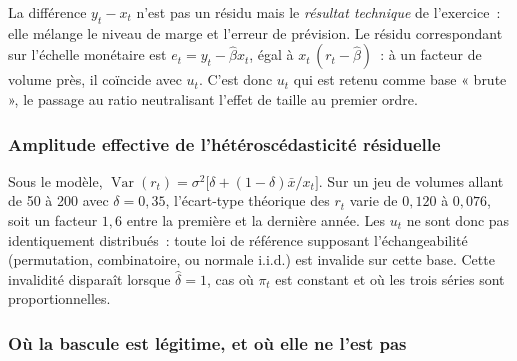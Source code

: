 \documentclass[a4paper,11pt]{article}
\begin{document}
\noindent
La différence $y_t - x_t$ n'est pas un résidu mais le \emph{résultat technique}
de l'exercice~: elle mélange le niveau de marge et l'erreur de prévision. Le
résidu correspondant sur l'échelle monétaire est $e_t = y_t - \hat\beta x_t$,
égal à $x_t\,(r_t - \hat\beta)$~: à un facteur de volume près, il coïncide avec
$u_t$. C'est donc $u_t$ qui est retenu comme base « brute », le passage au ratio
neutralisant l'effet de taille au premier ordre.

\subsubsection*{Amplitude effective de l'hétéroscédasticité résiduelle}

Sous le modèle, $\operatorname{Var}(r_t) = \sigma^2\big[\delta +
(1-\delta)\bar x/x_t\big]$. Sur un jeu de volumes allant de 50 à 200 avec
$\delta = 0{,}35$, l'écart-type théorique des $r_t$ varie de $0{,}120$ à
$0{,}076$, soit un facteur $1{,}6$ entre la première et la dernière année. Les
$u_t$ ne sont donc pas identiquement distribués~: toute loi de référence
supposant l'échangeabilité (permutation, combinatoire, ou normale i.i.d.) est
invalide sur cette base. Cette invalidité disparaît lorsque $\hat\delta = 1$,
cas où $\pi_t$ est constant et où les trois séries sont proportionnelles.

\subsubsection*{Où la bascule est légitime, et où elle ne l'est pas}
\end{document}
